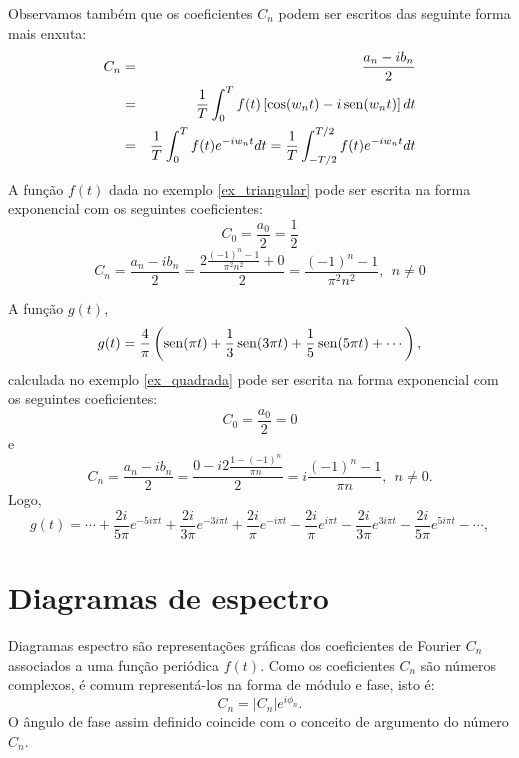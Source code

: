Observamos também que os coeficientes $C_n$ podem ser escritos das seguinte forma mais enxuta:
\begin{eqnarray*}
C_n &=& \frac{a_n - ib_n}{2}\\
&=& \frac{1}{T}\int_0^Tf(t)\left[\cos(w_n t)-i\operatorname{sen}(w_n t)\right]dt\\
&=&\frac{1}{T}\int_0^Tf(t)e^{-iw_nt}dt =\frac{1}{T}\int_{-T/2}^{T/2}f(t)e^{-iw_nt}dt 
\end{eqnarray*}

\begin{ex}{\label{ex_exp_1}} A função $f(t)$ dada no exemplo \ref{ex_triangular} pode ser escrita na forma exponencial com os seguintes coeficientes:
$$C_0=\frac{a_0}{2}=\frac{1}{2}$$
$$C_n=\frac{a_n-ib_n}{2}=\frac{2\frac{(-1)^n-1}{\pi^2n^2}+0}{2}=\frac{(-1)^n-1}{\pi^2n^2},~~n\neq 0$$
 
\end{ex}

\begin{ex}{\label{ex_exp_2}} A função $g(t)$,
$$
g(t)=\frac{4}{\pi}\left(\operatorname{sen}(\pi t)+\frac{1}{3}\operatorname{sen}(3\pi t)+\frac{1}{5}\operatorname{sen}(5\pi t)+\cdots\right),
$$
calculada no exemplo \ref{ex_quadrada} pode ser escrita na forma exponencial com os seguintes coeficientes:
$$C_0=\frac{a_0}{2}=0$$
e
$$C_n=\frac{a_n-ib_n}{2}=\frac{0-i2\frac{1-(-1)^n}{\pi n}}{2}=i\frac{(-1)^n-1}{\pi n},~~n\neq 0.$$
Logo,
$$
g(t)=\cdots+\frac{2i}{5\pi}e^{-5i\pi t}+\frac{2i}{3\pi}e^{-3i\pi t}+\frac{2i}{\pi}e^{-i\pi t}-\frac{2i}{\pi}e^{i\pi t}-\frac{2i}{3\pi}e^{3i\pi t}-\frac{2i}{5\pi}e^{5i\pi t}-\cdots,
$$

\end{ex}

\section{Diagramas de espectro}
Diagramas espectro são representações gráficas dos coeficientes de Fourier $C_n$ associados a uma função periódica $f(t)$. Como os coeficientes $C_n$ são números complexos, é comum representá-los na forma de módulo e fase, isto é:
$$C_n = |C_n|e^{i\phi_n}.$$
O ângulo de fase assim definido coincide com o conceito de argumento do número $C_n$.

